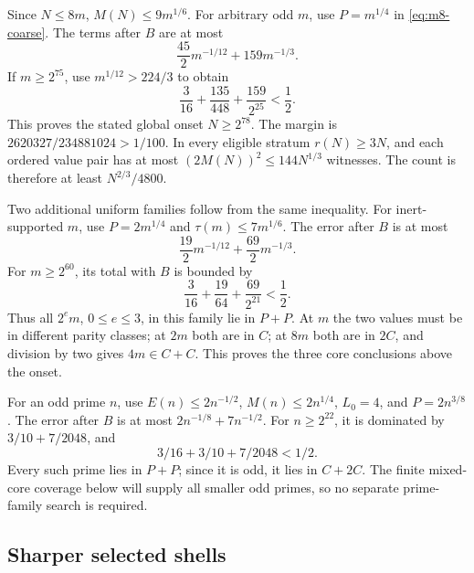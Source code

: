 Since \(N\le8m\), \(M(N)\le9m^{1/6}\).
For arbitrary odd \(m\), use \(P=m^{1/4}\) in
\eqref{eq:m8-coarse}. The terms after \(B\) are at most
\[
                      \frac{45}{2}m^{-1/12}+159m^{-1/3}.
\]
If \(m\ge2^{75}\), use \(m^{1/12}>224/3\) to obtain
\begin{equation}
                    \frac3{16}+\frac{135}{448}
                                    +\frac{159}{2^{25}}<\frac12.
                                                                    \label{eq:m8-globalnumeric}
\end{equation}
This proves the stated global onset \(N\ge2^{78}\).
The margin is
\(2620327/234881024>1/100\).
In every eligible stratum \(r(N)\ge3N\), and each ordered value
pair has at most \((2M(N))^2\le144N^{1/3}\) witnesses.
The count is therefore at least \(N^{2/3}/4800\).

Two additional uniform families follow from the same inequality.
For inert-supported \(m\), use \(P=2m^{1/4}\) and
\(\tau(m)\le7m^{1/6}\).
The error after \(B\) is at most
\[
                    \frac{19}{2}m^{-1/12}
                                 +\frac{69}{2}m^{-1/3}.
\]
For \(m\ge2^{60}\), its total with \(B\) is bounded by
\begin{equation}
                  \frac3{16}+\frac{19}{64}
                                      +\frac{69}{2^{21}}<\frac12.
                                                                    \label{eq:m8-coretail}
\end{equation}
Thus all \(2^em\), \(0\le e\le3\), in this family lie in \(P+P\).
At \(m\) the two values must be in different parity classes;
at \(2m\) both are in \(C\); at \(8m\) both are in \(2C\),
and division by two gives \(4m\in C+C\).
This proves the three core conclusions above the onset.

For an odd prime \(n\), use \(E(n)\le2n^{-1/2}\),
\(M(n)\le2n^{1/4}\), \(L_0=4\), and \(P=2n^{3/8}\).
The error after \(B\) is at most \(2n^{-1/8}+7n^{-1/2}\).
For \(n\ge2^{22}\), it is dominated by
\(3/10+7/2048\), and
\begin{equation}
                         3/16+3/10+7/2048<1/2.               \label{eq:m8-prime}
\end{equation}
Every such prime lies in \(P+P\); since it is odd,
it lies in \(C+2C\). The finite mixed-core coverage below will
supply all smaller odd primes, so no separate prime-family
search is required.

\subsection{Sharper selected shells}

